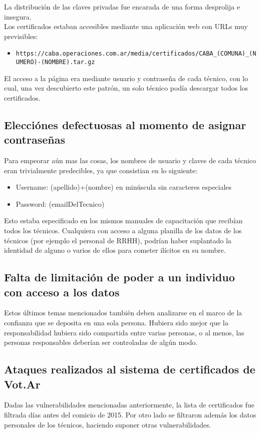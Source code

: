 La distribución de las claves privadas fue encarada de una forma desprolija e insegura.\\

Los certificados estaban accesibles mediante una aplicación web con URLs muy previsibles:\\

\begin{itemize}
	\item \texttt{https://caba.operaciones.com.ar/media/certificados/CABA\_(COMUNA)\_(NUMERO)-(NOMBRE).tar.gz}
\end{itemize}

El acceso a la página era mediante usuario y contraseña de cada técnico, con lo cual, una vez descubierto este patrón, un solo técnico podía descargar todos los certificados.

\subsection{Elecciónes defectuosas al momento de asignar contraseñas}
Para empeorar aún mas las cosas, los nombres de usuario y claves de cada técnico eran trivialmente predecibles, ya que consistian en lo siguiente:

\begin{itemize}
	\item Username: (apellido)+(nombre) en minúscula sin caracteres especiales
	\item Password: (emailDelTecnico)
\end{itemize}

Esto estaba especificado en los mismos manuales de capacitación que recibían todos los técnicos. Cualquiera con acceso a alguna planilla de los datos de los técnicos (por ejemplo el personal de RRHH), podrían haber suplantado la identidad de alguno o varios de ellos para cometer ilícitos en su nombre.

\subsection{Falta de limitación de poder a un individuo con acceso a los datos}

Estos últimos temas mencionados también deben analizarse en el marco de la confianza que se deposita en una sola persona. Hubiera sido mejor que la responsabilidad hubiera sido compartida entre varias personas, o al menos, las personas responsables deberían ser controladas de algún modo.

\subsection{Ataques realizados al sistema de certificados de Vot.Ar}
Dadas las vulnerabilidades mencionadas anteriormente, la lista de certificados fue filtrada días antes del comicio de 2015. Por otro lado se filtraron además los datos personales de los técnicos, haciendo suponer otras vulnerabilidades.

